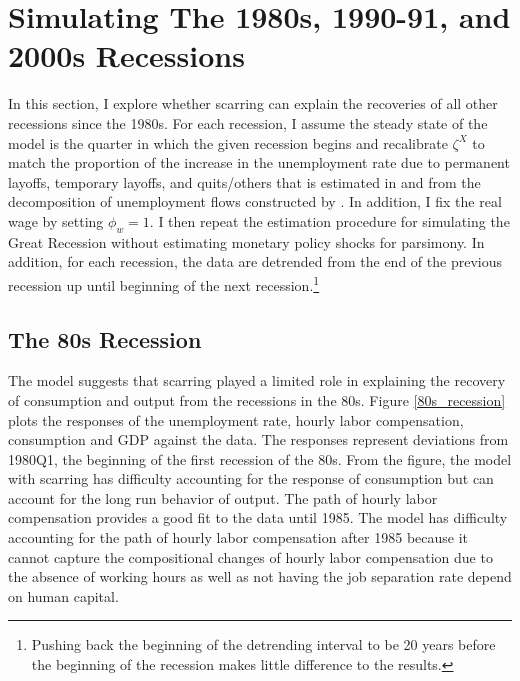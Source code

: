 
\appendix
\setcounter{figure}{0} \renewcommand{\thefigure}{A.\arabic{figure}}
\setcounter{table}{0} \renewcommand{\thetable}{A.\arabic{table}}
\label{sec:appendix}




\section{Simulating The 1980s, 1990-91, and 2000s Recessions}

In this section, I explore whether scarring can explain the recoveries of all other recessions since the 1980s. For each recession, I assume the steady state of the model is the quarter in which the given recession begins and recalibrate $\zeta^{X}$ to match the proportion of the increase in the unemployment rate due to permanent layoffs, temporary layoffs, and quits/others that is estimated in \cite{Gertler2022} and from the decomposition of unemployment flows constructed by \cite{Fujita2017}. In addition, I fix the real wage by setting $\phi_{w} =1$.  I then repeat the estimation procedure for simulating the Great Recession without estimating monetary policy shocks for parsimony. In addition, for each recession, the data are detrended from the end of the previous recession up until beginning of the next recession.\footnote{ Pushing back the beginning of the detrending interval to be 20 years before the beginning of the recession makes little difference to the results. }

\subsection{The 80s Recession}

The model suggests that scarring played a limited role in explaining the recovery of consumption and output from the recessions in the 80s. Figure \ref{80s_recession} plots the responses of the unemployment rate, hourly labor compensation, consumption and GDP against the data. The responses represent deviations from 1980Q1, the beginning of the first recession of the 80s. From the figure, the model with scarring has difficulty accounting for the response of consumption but can account for the long run behavior of output. The path of hourly labor compensation provides a good fit to the data until 1985. The model has difficulty accounting for the path of hourly labor compensation after 1985 because it cannot capture the compositional changes of hourly labor compensation due to the absence of working hours as well as not having the job separation rate depend on human capital.  

